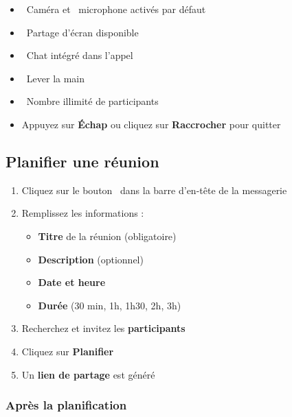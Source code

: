 \documentclass[12pt,a4paper]{article}
\begin{document}
\begin{astucebox}
\begin{itemize}[leftmargin=1.5em]
    \item \faVideo\ Caméra et \faMicrophone\ microphone activés par défaut
    \item \faDesktop\ Partage d'écran disponible
    \item \faComments\ Chat intégré dans l'appel
    \item \faHandPaper\ Lever la main
    \item \faUsers\ Nombre illimité de participants
    \item Appuyez sur \textbf{Échap} ou cliquez sur \textbf{Raccrocher} pour quitter
\end{itemize}
\end{astucebox}

\subsection{Planifier une réunion}

\begin{etapebox}
\begin{enumerate}[leftmargin=1.5em]
    \item Cliquez sur le bouton \faCalendarPlus\ dans la barre d'en-tête de la messagerie
    \item Remplissez les informations :
    \begin{itemize}
        \item \textbf{Titre} de la réunion (obligatoire)
        \item \textbf{Description} (optionnel)
        \item \textbf{Date et heure}
        \item \textbf{Durée} (30 min, 1h, 1h30, 2h, 3h)
    \end{itemize}
    \item Recherchez et invitez les \textbf{participants}
    \item Cliquez sur \textbf{Planifier}
    \item Un \textbf{lien de partage} est généré
\end{enumerate}
\end{etapebox}

\subsubsection{Après la planification}
\end{document}
